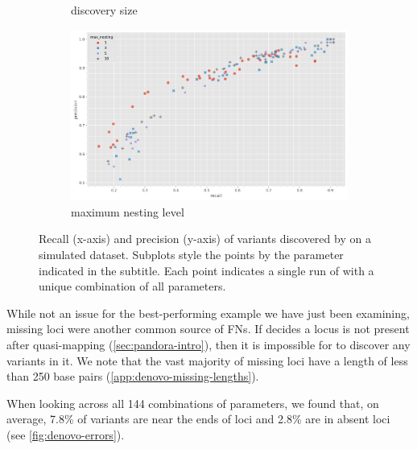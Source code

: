\begin{figure}
\begin{subfigure}[b]{0.475\textwidth}
        \centering
        \caption{\denovo{} discovery \kmer{} size}
        \label{fig:denovo-sims-kmer-size}
     \end{subfigure}
     \begin{subfigure}[b]{0.475\textwidth}
         \centering
        \includegraphics[width=1\linewidth]{Chapter1/Figs/denovo_precrec_nesting.png}
         \caption{\prg{} maximum nesting level}
         \label{fig:denovo-sims-nesting}
     \end{subfigure}
    \caption{Recall (x-axis) and precision (y-axis) of \denovo{} variants discovered by \pandora{} on a simulated dataset. Subplots style the points by the parameter indicated in the subtitle. Each point indicates a single run of \pandora{} with a unique combination of all parameters.}
        \label{fig:denovo-sims}
\end{figure}

While not an issue for the best-performing example we have just been examining, missing loci were another common source of FNs. If \pandora{} decides a locus is not present after quasi-mapping (\autoref{sec:pandora-intro}), then it is impossible for \denovo{} to discover any variants in it. We note that the vast majority of missing loci have a length of less than 250 base pairs (\autoref{app:denovo-missing-lengths}).

When looking across all 144 combinations of parameters, we found that, on average, 7.8\% of variants are near the ends of loci and 2.8\% are in absent loci (see \autoref{fig:denovo-errors}). 

